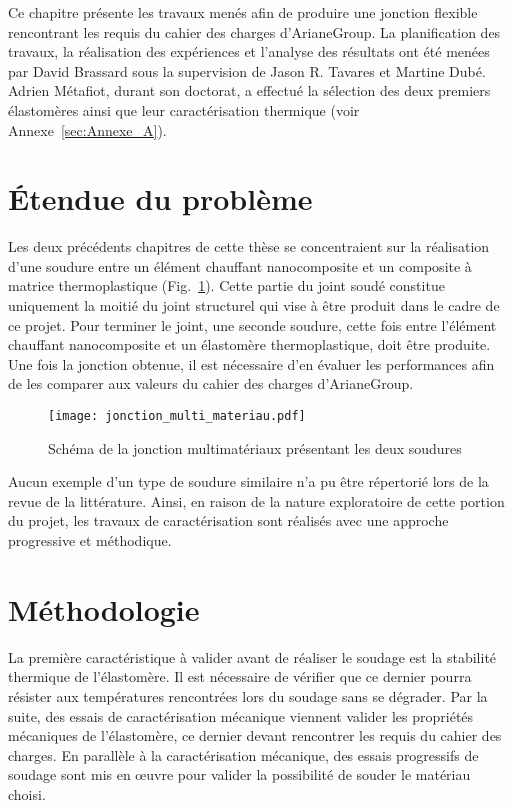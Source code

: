\label{sec:Theme3}

Ce chapitre présente les travaux menés afin de produire une jonction flexible rencontrant les requis du cahier des charges d'ArianeGroup. 
La planification des travaux, la réalisation des expériences et l'analyse des résultats ont été menées par David Brassard sous la supervision de Jason R. Tavares et Martine Dubé. 
Adrien Métafiot, durant son doctorat, a effectué la sélection des deux premiers élastomères ainsi que leur caractérisation thermique (voir Annexe~\ref{sec:Annexe_A}). 

\section{Étendue du problème}

Les deux précédents chapitres de cette thèse se concentraient sur la réalisation d'une soudure entre un élément chauffant nanocomposite et un composite à matrice thermoplastique \mbox{(Fig. \ref{fig:scema_double_jonction})}. 
Cette partie du joint soudé constitue uniquement la moitié du joint structurel qui vise à être produit dans le cadre de ce projet. 
Pour terminer le joint, une seconde soudure, cette fois entre l'élément chauffant nanocomposite et un élastomère thermoplastique, doit être produite. 
Une fois la jonction obtenue, il est nécessaire d'en évaluer les performances afin de les comparer aux valeurs du cahier des charges d'ArianeGroup. 

\begin{figure}[h]
	\centering
	\texttt{[image: jonction\_multi\_materiau.pdf]}
	\caption{Schéma de la jonction multimatériaux présentant les deux soudures}
	\label{fig:scema_double_jonction}
\end{figure}

Aucun exemple d'un type de soudure similaire n'a pu être répertorié lors de la revue de la littérature. 
Ainsi, en raison de la nature exploratoire de cette portion du projet, les travaux de caractérisation sont réalisés avec une approche progressive et méthodique. 

\section{Méthodologie}

La première caractéristique à valider avant de réaliser le soudage est la stabilité thermique de l'élastomère. 
Il est nécessaire de vérifier que ce dernier pourra résister aux températures rencontrées lors du soudage sans se dégrader. 
Par la suite, des essais de caractérisation mécanique viennent valider les propriétés mécaniques de l'élastomère, ce dernier devant rencontrer les requis du cahier des charges. 
En parallèle à la caractérisation mécanique, des essais progressifs de soudage sont mis en œuvre pour valider la possibilité de souder le matériau choisi. 

